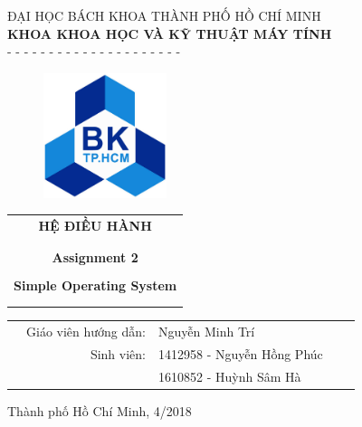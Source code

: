\begin{titlepage}
\vspace{1.5cm}
\begin{center} \large
ĐẠI HỌC BÁCH KHOA THÀNH PHỐ HỒ CHÍ MINH \\
\textbf{KHOA KHOA HỌC VÀ KỸ THUẬT MÁY TÍNH} \\
- - - - - - - - - - - - - - - - - - - - - 
\end{center}


\vspace{1cm}
\begin{figure}[h!]
\begin{center}
\includegraphics[width=3.6cm]{Images/LogoBK}
\end{center}
\end{figure}
\vspace{1cm}



\begin{center}
\begin{tabular}{c}
\multicolumn{1}{c}{\textbf{{\Huge HỆ ĐIỀU HÀNH}}}\\
\\ \hline \\
\textbf{{\Large Assignment 2}}\\
\\
\textbf{{\huge Simple Operating System}}\\
\\ \hline \\
\end{tabular}
\end{center}



\begin{table}[h]
\begin{tabular}{rrlrr}
\hspace{5cm} 
& {\large Giáo viên hướng dẫn}: & {\large Nguyễn Minh Trí} & & \\ 
& {\large Sinh viên}: & {\large 1412958 - Nguyễn Hồng Phúc} \\
& {} & {\large 1610852 - Huỳnh Sâm Hà} \\
\end{tabular}
\end{table}

\vspace{3cm}

\begin{center}
{\footnotesize Thành phố Hồ Chí Minh, 4/2018}
\end{center}

\end{titlepage}
